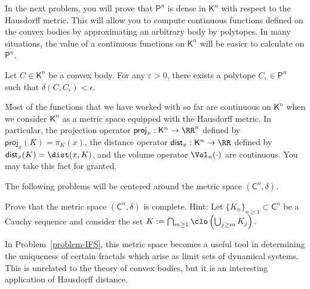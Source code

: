 \documentclass[11pt]{article}
\begin{document}
In the next problem, you will prove that $\mathsf{P}^n$ is dense in $\mathsf{K}^n$ with respect to the Hausdorff metric. This will allow you to compute continuous functions defined on the convex bodies by approximating an arbitrary body by polytopes. In many situations, the value of a continuous functions on $\mathsf{K}^n$ will be easier to calculate on $\mathsf{P}^n$. 
 
\begin{prob} [20 points]
    Let $C \in \mathsf{K}^n$ be a convex body. For any $\varepsilon > 0$, there exists a polytope $C_\varepsilon \in \mathsf{P}^n$ such that $\delta (C, C_\epsilon) < \epsilon$. 
\end{prob} 

\begin{remark}
    Most of the functions that we have worked with so far are continuous on $\mathsf{K}^n$ when we consider $\mathsf{K}^n$ as a metric space equipped with the Hausdorff metric. In particular, the projection operator $\mathsf{proj}_x : \mathsf{K}^n \to \RR^n$ defined by $\mathsf{proj}_x(K) = \pi_K(x)$, the distance operator $\mathsf{dist}_x : \mathsf{K}^n \to \RR$ defined by $\mathsf{dist}_x(K) = \dist(x, K)$, and the volume operator $\Vol_n(\cdot)$ are continuous. You may take this fact for granted. 
\end{remark}

The following problems will be centered around the metric space $(\mathsf{C}^n, \delta)$.

\begin{prob} [20 points]
    Prove that the metric space $(\mathsf{C}^n, \delta)$ is complete. Hint: Let $\{K_n\}_{n \geq 1} \subset \mathsf{C}^n$ be a Cauchy sequence and consider the set $K := \bigcap_{m \geq 1} \clo \left ( \bigcup_{j \geq m} K_j \right ).$
\end{prob}


In Problem~\ref{problem-IFS}, this metric space becomes a useful tool in determining the uniqueness of certain fractals which arise as limit sets of dynamical systems. This is unrelated to the theory of convex bodies, but it is an interesting application of Hausdorff distance. 
\end{document}
